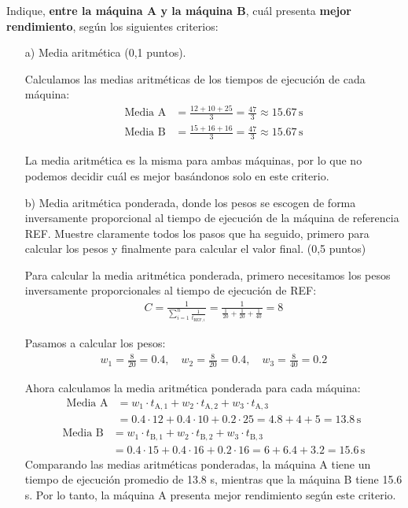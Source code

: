\documentclass[a4paper,12pt]{article}
\begin{document}
Indique, \textbf{entre la máquina A y la máquina B}, cuál presenta \textbf{mejor rendimiento}, según los siguientes criterios:
\begin{enumerate}
    \item[a)] Media aritmética (0,1 puntos).
    
    Calculamos las medias aritméticas de los tiempos de ejecución de cada máquina:
    \begin{align*}
    \text{Media A} &= \frac{12 + 10 + 25}{3} = \frac{47}{3} \approx 15.67 \, \text{s} \\
    \text{Media B} &= \frac{15 + 16 + 16}{3} = \frac{47}{3} \approx 15.67 \, \text{s}
    \end{align*}

    La media aritmética es la misma para ambas máquinas, por lo que no podemos decidir cuál es mejor basándonos solo en este criterio.


    \item[b)] Media aritmética ponderada, donde los pesos se escogen de forma inversamente proporcional al tiempo de ejecución de la máquina de referencia REF. Muestre claramente todos los pasos que ha seguido, primero para calcular los pesos y finalmente para calcular el valor final. (0,5 puntos)
    
    Para calcular la media aritmética ponderada, primero necesitamos los pesos inversamente proporcionales al tiempo de ejecución de REF:
    \begin{align*}
        C = \frac{1}{\sum_{i=1}^{n} \frac{1}{t_{\text{REF}, i}}} = \frac{1}{\frac{1}{20} + \frac{1}{20} + \frac{1}{40}} = 8
    \end{align*}

    Pasamos a calcular los pesos:
    \begin{align*}
        w_{1} = \frac{8}{20} = 0.4, \quad
        w_{2} = \frac{8}{20} = 0.4, \quad
        w_{3} = \frac{8}{40} = 0.2
    \end{align*}

    Ahora calculamos la media aritmética ponderada para cada máquina:
    \begin{align*}
        \text{Media A} &= w_{1} \cdot t_{\text{A}, 1} + w_{2} \cdot t_{\text{A}, 2} + w_{3} \cdot t_{\text{A}, 3} \\
        &= 0.4 \cdot 12 + 0.4 \cdot 10 + 0.2 \cdot 25 = 4.8 + 4 + 5 = 13.8 \, \text{s}
    \end{align*}
    \begin{align*}
        \text{Media B} &= w_{1} \cdot t_{\text{B}, 1} + w_{2} \cdot t_{\text{B}, 2} + w_{3} \cdot t_{\text{B}, 3} \\
        &= 0.4 \cdot 15 + 0.4 \cdot 16 + 0.2 \cdot 16 = 6 + 6.4 + 3.2 = 15.6 \, \text{s}
    \end{align*}
    Comparando las medias aritméticas ponderadas, la máquina A tiene un tiempo de ejecución promedio de 13.8 s, mientras que la máquina B tiene 15.6 s. Por lo tanto, la máquina A presenta mejor rendimiento según este criterio.





\end{enumerate}
\end{document}
